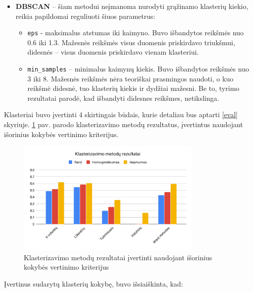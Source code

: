 \documentclass{VUMIFInfBakalaurinis}
\begin{document}
\begin{itemize}
\item
  \textbf{DBSCAN} -- šiam metodui neįmanoma nurodyti grąžinamo klasterių
  kiekio, reikia papildomai reguliuoti šiuos parametrus:

  \begin{itemize}
  \item
    \texttt{eps} - maksimalus atstumas iki kaimyno. Buvo išbandytos reikšmės nuo
    0.6 iki 1.3. Mažesnės reikšmės visus duomenis priskirdavo triukšmui,
    didesnės -- visus duomenis priskirdavo vienam klasteriui.
  \item
    \texttt{min\_samples} -- minimalus kaimynų kiekis. Buvo išbandytos reikšmės
    nuo 3 iki 8. Mažesnės reikšmės nėra teoriškai prasmingos naudoti, o
    kuo reikšmė didesnė, tuo klasterių kiekis ir dydžiai mažesni. Be to,
    tyrimo rezultatai parodė, kad išbandyti didesnes reikšmes,
    netikslinga.
  \end{itemize}
\end{itemize}

Klasteriai buvo įvertinti 4 skirtingais būdais, kurie detaliau bus
aptarti \ref{eval} skyriuje. \ref{clusters} pav. parodo klasterizavimo metodų rezultatus,
įvertintus naudojant išorinius kokybės vertinimo kriterijus.

\begin{figure}[H]
	\centering
	\includegraphics[width=0.8\textwidth]{./img/image27.png}
  \caption{Klasterizavimo metodų rezultatai įvertinti naudojant išorinius kokybės vertinimo
  kriterijus}
  \label{clusters}
\end{figure}

Įvertinus sudarytų klasterių kokybę, buvo išsiaiškinta, kad:
\end{document}
